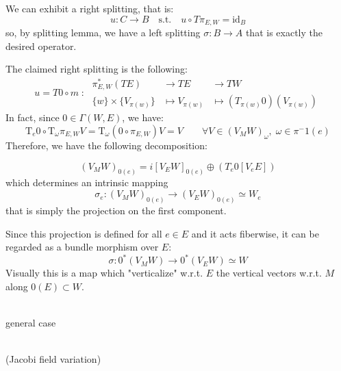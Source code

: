 \documentclass[a4paper,12pt,fleqn]{scrartcl}  %
\begin{document}
We can exhibit a right splitting, that is:
\begin{displaymath}
	u : C \rightarrow B \quad \textrm{s.t.} \quad u \circ T \pi_{E,W} = \textrm{id}_B
\end{displaymath}
so, by splitting lemma, we have a left splitting $\sigma : B \rightarrow A$ that is exactly the desired operator.

The claimed right splitting is the following:
	\begin{displaymath}
		u = T0 \circ m \; : \; 
		\begin{array}{ccc}
			\pi^\ast_{E,W} \left(TE \right) &\rightarrow TE &\rightarrow TW \\
			\{w\} \times \{V_{\pi(w)} \} &\mapsto V_{\pi(w)} &\mapsto \left( T_{\pi(w)}0\right) (V_{\pi(w)})		
		\end{array}
	\end{displaymath}
%
In fact, since $0 \in \Gamma (W,E)$, we have:
\begin{displaymath}
	\textrm{T}_e 0 \circ \textrm{T}_\omega \pi_{E,W} V =
	\textrm{T}_\omega \left( 0 \circ \pi_{E,W} \right) V = 
	V \qquad \forall V \in \left( V_M W \right)_\omega ,\; \omega \in \pi^-1(e)
\end{displaymath}
Therefore, we have the following decomposition:

\begin{displaymath}
	\left( V_M W \right)_{0(e)} = 
	i\left[ V_E W \right]_{0(e)} \oplus \left( T_e 0 \left[ V_e E\right] \right)
\end{displaymath}
which determines an intrinsic mapping 
\begin{displaymath}
	\sigma_e : \left( V_M W \right)_{0(e)} \rightarrow \left( V_E W \right)_{0(e)} \simeq W_e
\end{displaymath}
that is simply the projection on the first component.

Since this projection is defined for all $e \in E$ and it acts fiberwise, it can be regarded as a bundle morphism over $E$:
\begin{displaymath}
	\sigma : 0^\ast \left( V_M W \right) \rightarrow 0^\ast \left( V_E W \right) \simeq W
\end{displaymath} 
Visually this is a map which "verticalize" w.r.t. $E$ the vertical vectors w.r.t. $M$ along $0(E) \subset W$.
%

\begin{minipage}{.5\textwidth}
  \centering
	
 \\ \small{general case}
\end{minipage}
\begin{minipage}{.5\textwidth}
  \centering
	
 \\ \small{ (Jacobi field variation)}
\end{minipage}%
\end{document}

